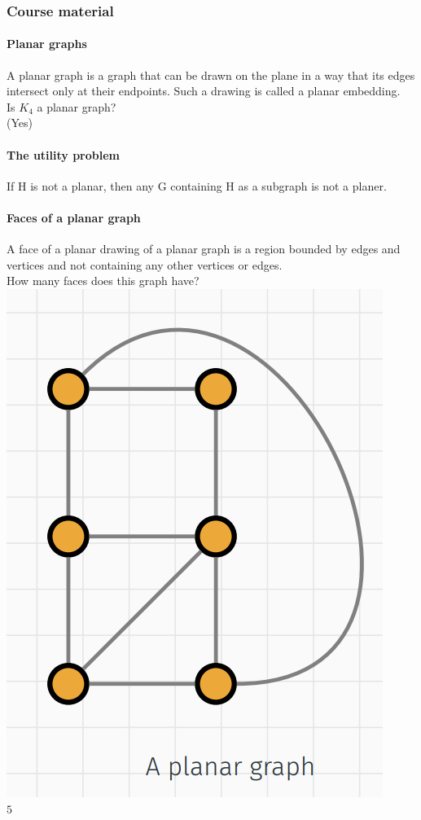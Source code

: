 \documentclass{article}
\begin{document}
\subsubsection{Course material}
\paragraph{Planar graphs}
A planar graph is a graph that can be drawn on the plane in a way that its edges intersect only at their endpoints.\newline
Such a drawing is called a planar embedding.\\
Is $K_4$ a planar graph?\\
(Yes)
\paragraph{The utility problem}
If H is not a planar, then any G containing H as a subgraph is not a planer.
\paragraph{Faces of a planar graph}
A face of a planar drawing of a planar graph is a region bounded by edges and vertices and not containing any other vertices or edges.\\
How many faces does this graph have?\\
\includegraphics{0092}\\
$5$
\end{document}
